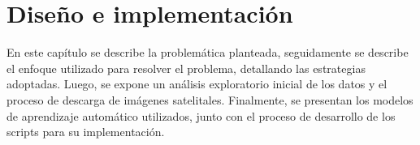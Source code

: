 \chapter{Diseño e implementación} %

\label{Chapter3} %

En este capítulo se describe la problemática planteada, seguidamente se describe el enfoque 
utilizado para resolver el problema, detallando las estrategias adoptadas. Luego, se expone 
un análisis exploratorio inicial de los datos y el proceso de descarga de imágenes satelitales. 
Finalmente, se presentan los modelos de aprendizaje automático utilizados, junto con el proceso 
de desarrollo de los scripts para su implementación.

